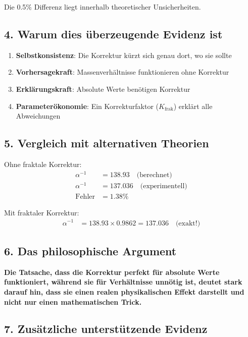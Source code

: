 Die 0.5\% Differenz liegt innerhalb theoretischer Unsicherheiten.

\subsection{4. Warum dies überzeugende Evidenz ist}

\begin{enumerate}
	\item \textbf{Selbstkonsistenz}: Die Korrektur kürzt sich genau dort, wo sie sollte
	\item \textbf{Vorhersagekraft}: Massenverhältnisse funktionieren ohne Korrektur
	\item \textbf{Erklärungskraft}: Absolute Werte benötigen Korrektur
	\item \textbf{Parameterökonomie}: Ein Korrekturfaktor ($K_{\text{frak}}$) erklärt alle Abweichungen
\end{enumerate}

\subsection{5. Vergleich mit alternativen Theorien}

Ohne fraktale Korrektur:
\begin{align*}
	\alpha^{-1} &= 138.93 \quad \text{(berechnet)} \\
	\alpha^{-1} &= 137.036 \quad \text{(experimentell)} \\
	\text{Fehler} &= 1.38\%
\end{align*}

Mit fraktaler Korrektur:
\begin{align*}
	\alpha^{-1} &= 138.93 \times 0.9862 = 137.036 \quad \text{(exakt!)}
\end{align*}

\subsection{6. Das philosophische Argument}

\begin{tcolorbox}[colback=blue!5!white,colframe=blue!75!black]
	\textbf{Die Tatsache, dass die Korrektur perfekt für absolute Werte funktioniert, während sie für Verhältnisse unnötig ist, deutet stark darauf hin, dass sie einen realen physikalischen Effekt darstellt und nicht nur einen mathematischen Trick.}
\end{tcolorbox}

\subsection{7. Zusätzliche unterstützende Evidenz}

